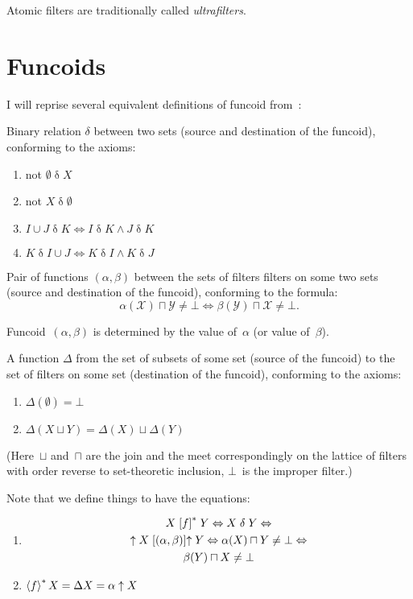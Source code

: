 \documentclass{amsart}
\begin{document}
Atomic filters are traditionally called \emph{ultrafilters}.

\section{Funcoids}

I will reprise several equivalent definitions of funcoid from~\cite{volume-1-edition1}:

Binary relation $\delta$ between two sets (source and destination of the funcoid), conforming to the axioms:

\begin{enumerate}
\item not $\emptyset\mathrel{\delta}X$
\item not $X\mathrel{\delta}\emptyset$
\item $I\cup J \mathrel{\delta} K\Leftrightarrow I \mathrel{\delta}K\wedge J\mathrel{\delta}K$
\item $K\mathrel{\delta}I\cup J\Leftrightarrow K \mathrel{\delta}I\wedge K\mathrel{\delta}J$
\end{enumerate}

Pair of functions $(\alpha,\beta)$ between the sets of filters filters on some two sets (source and destination of the funcoid), conforming to the formula:
\[ \alpha (\mathcal{X})\sqcap \mathcal{Y}\neq \bot \Leftrightarrow \beta (\mathcal{Y})\sqcap \mathcal{X}\neq \bot. \]

\begin{rem}
Funcoid~$(\alpha,\beta)$ is determined by the value of~$\alpha$ (or value of~$\beta$).
\end{rem}

A function $\Delta$ from the set of subsets of some set (source of the funcoid) to the set of filters on some set (destination of the funcoid), conforming to the axioms:

\begin{enumerate}
\item $\Delta (\emptyset)=\bot$
\item $\Delta (X\sqcup Y)=\Delta (X)\sqcup \Delta (Y)$
\end{enumerate}

(Here~$\sqcup$ and~$\sqcap$ are the join and the meet correspondingly on the lattice of filters with order reverse to set-theoretic inclusion, $\bot$~is the improper filter.)

Note that we define things to have the equations:
\begin{enumerate}
\item
\begin{multline*}
X\mathrel{\left[f\right]^{\ast}}Y \Leftrightarrow X\mathrel{\delta}Y \Leftrightarrow \\ \uparrow X\mathrel{\left[(\alpha,\beta)\right]}\uparrow Y \Leftrightarrow
\alpha (X)\sqcap Y\neq \bot \Leftrightarrow \\ \beta (Y)\sqcap X\neq \bot
\end{multline*}
\item $\left\langle f\right\rangle ^{\ast}X = \Delta X = \alpha\uparrow X$
\end{enumerate}
\end{document}

